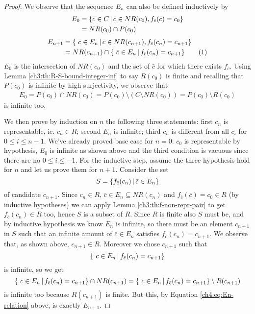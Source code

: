 \begin{proof}
	We observe that the sequence $E_n$ can also be defined inductively by
	\begin{align*}
		E_0 &= \{ \bar{c} \in C \,\vert\, \bar{c} \in NR(c_0), f_{\bar{c}}(\bar{c}) = c_0 \} \\
		&= NR(c_0) \cap P(c_0)
	\end{align*}
	\begin{align*}
		E_{n+1} &= \{\ \bar{c} \in E_n \svert \bar{c} \in NR(c_{n+1}), f_{\bar{c}}(c_n) = c_{n+1} \} \\
		&= NR(c_{n+1}) \cap \{\ \bar{c} \in E_n \svert f_{\bar{c}}(c_n) = c_{n+1} \} \addtocounter{equation}{1}\tag{\theequation} \label{ch4:eq:En-relation}
	\end{align*}
	$E_0$ is the intersection of $NR(c_0)$ and the set of $\bar{c}$ for which there exists $f_{\bar{c}}$. Using Lemma \ref{ch3:th:R-S-bound-integer-inf} to say $R(c_0)$ is finite and recalling that $P(c_0)$ is infinite by high surjectivity, we observe that
	\begin{align*}
		E_0 = P(c_0) \cap NR(c_0) = P(c_0) \setminus (C \setminus NR(c_0)) = P(c_0) \setminus R(c_0)
	\end{align*}
	is infinite too.

	We then prove by induction on $n$ the following three statements: first $c_n$ is representable, ie. $c_n \in R$; second $E_n$ is infinite; third $c_n$ is different from all $c_i$ for $0 \le i \le n - 1$.
	We've already proved base case for $n = 0$: $c_0$ is representable by hypothesis, $E_0$ is infinite as shown above and the third condition is vacuous since there are no $0 \le i \le -1$.
	For the inductive step, assume the three hypothesis hold for $n$ and let us prove them for $n + 1$.
	Consider the set
	\[
	S = \{ f_{\bar{c}}(c_n) \,\vert\, \bar{c} \in E_n \}
	\]
	of candidate $c_{n+1}$.
	Since $c_n \in R$, $\bar{c} \in E_n \subseteq NR(c_n)$ and $f_{\bar{c}}(\bar{c}) = c_0 \in R$ (by inductive hypotheses) we can apply Lemma \ref{ch3:th:f-non-repr-pair} to get $f_{\bar{c}}(c_n) \in R$ too, hence $S$ is a subset of $R$.
	Since $R$ is finite also $S$ must be, and by inductive hypothesis we know $E_n$ is infinite, so there must be an element $c_{n+1}$ in $S$ such that an infinite amount of $\bar{c} \in E_n$ satisfies $f_{\bar{c}}(c_n) = c_{n+1}$. We observe that, as shown above, $c_{n+1} \in R$. Moreover we chose $c_{n+1}$ such that
	\[
	\{\ \bar{c} \in E_n \,\vert\, f_{\bar{c}}(c_n) = c_{n+1} \}
	\]
	is infinite, so we get
	\[
	\{\ \bar{c} \in E_n \,\vert\, f_{\bar{c}}(c_n) = c_{n+1} \} \cap NR(c_{n+1}) = \{\ \bar{c} \in E_n \,\vert\, f_{\bar{c}}(c_n) = c_{n+1} \} \setminus R(c_{n+1})
	\]
	is infinite too because $R(c_{n+1})$ is finite. But this, by Equation \eqref{ch4:eq:En-relation} above, is exactly $E_{n+1}$.


\end{proof}
